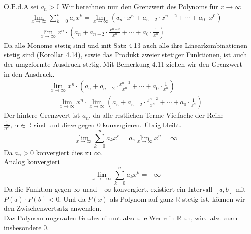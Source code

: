 \documentclass{article}
\begin{document}
    O.B.d.A sei \(a_n > 0\)
    Wir berechnen nun den Grenzwert des Polynoms für \(x \to \infty \)
    \begin{gather*}
        \lim_{x \to \infty} \sum_{k=0}^{n} a_k x^{k}
        = \lim_{x \to \infty} \left( a_n \cdot x^n + a_{n-2} \cdot x^{n-2} + \dotsm + a_0 \cdot x^0 \right) \\
        = \lim_{x \to \infty} x^n \cdot \left( a_n + a_{n-2} \cdot \frac{x^{n-2}}{x^n} + \dotsm + a_0 \cdot \frac{1}{x^n} \right)
    \end{gather*}
    Da alle Monome stetig sind und mit Satz 4.13 auch alle ihre Linearkombinationen stetig sind (Korollar 4.14), sowie das Produkt
    zweier stetiger Funktionen, ist auch der umgeformte Ausdruck stetig. Mit Bemerkung 4.11 ziehen wir den Grenzwert in den Ausdruck.
    \begin{gather*}
        \lim_{x \to \infty} x^n \cdot \left( a_n + a_{n-2} \cdot \frac{x^{n-2}}{x^n} + \dotsm + a_0 \cdot \frac{1}{x^n} \right) \\
        = \lim_{x \to \infty} x^n \cdot \lim_{x \to \infty} \left( a_n + a_{n-2} \cdot \frac{x^{n-2}}{x^n} + \dotsm + a_0 \cdot \frac{1}{x^n} \right)
    \end{gather*}
    Der hintere Grenzwert ist \(a_n\),
    da alle restlichen Terme Vielfache der Reihe \(\frac{1}{n^{\alpha}}, \ \alpha \in \mathbb{R}\) sind und diese gegen 0 konvergieren.
    Übrig bleibt:
    \[ \lim_{x \to \infty} \sum_{k=0}^{n} a_k x^{k} = a_n \lim_{x \to \infty} x^n = \infty \]
    Da \(a_n > 0\) konvergiert dies zu \(\infty \). \\
    Analog konvergiert
    \[ \lim_{x \to -\infty} \sum_{k=0}^{n} a_k x^{k} = - \infty \]
    Da die Funktion gegen \(\infty \) unad \(-\infty \) konvergiert,
    existiert ein Intervall \([a,b]\) mit \(P(a) \cdot P(b) < 0\). Und da \(P(x)\) als Polynom auf ganz \(\mathbb{R}\) stetig ist,
    können wir den Zwischenwertsatz anwenden. \\
    Das Polynom ungeraden Grades nimmt also alle Werte in \(\mathbb{R}\) an, wird also auch insbesondere 0.
\end{document}
